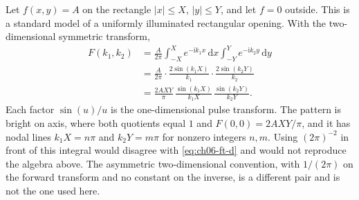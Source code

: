 \begin{example}
Let $f(x,y)=A$ on the rectangle $|x|\leq X$, $|y|\leq Y$, and let $f=0$ outside. This is a standard model of a uniformly illuminated rectangular opening. With the two-dimensional symmetric transform,
\begin{align}
F(k_1,k_2)
&=\frac{A}{2\pi}
\int_{-X}^{X}e^{-\mathrm{i}k_1 x}\,\mathrm{d}x
\int_{-Y}^{Y}e^{-\mathrm{i}k_2 y}\,\mathrm{d}y
\nonumber\\
&=\frac{A}{2\pi}
\cdot\frac{2\sin(k_1 X)}{k_1}
\cdot\frac{2\sin(k_2 Y)}{k_2}
\nonumber\\
&=\frac{2AXY}{\pi}
\,\frac{\sin(k_1 X)}{k_1 X}
\,\frac{\sin(k_2 Y)}{k_2 Y}.
\end{align}
Each factor $\sin(u)/u$ is the one-dimensional pulse transform. The pattern is bright on axis, where both quotients equal $1$ and $F(0,0)=2AXY/\pi$, and it has nodal lines $k_1 X=n\pi$ and $k_2 Y=m\pi$ for nonzero integers $n,m$. Using $(2\pi)^{-2}$ in front of this integral would disagree with \eqref{eq:ch06-ft-d} and would not reproduce the algebra above. The asymmetric two-dimensional convention, with $1/(2\pi)$ on the forward transform and no constant on the inverse, is a different pair and is not the one used here.
\end{example}
